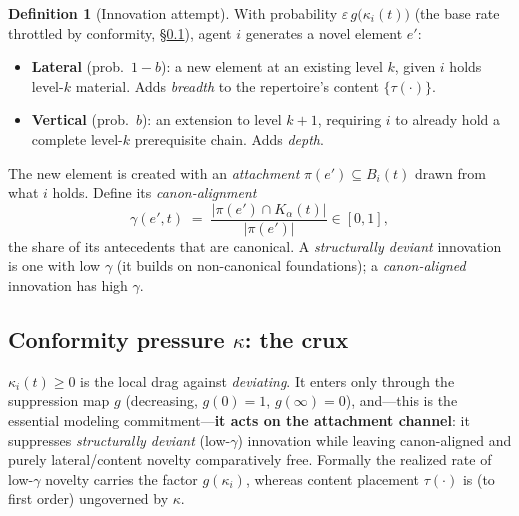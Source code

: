 \documentclass[11pt,letterpaper]{article}
\theoremstyle{definition}
\newtheorem{definition}{Definition}[section]
\theoremstyle{plain}
\newcommand{\pre}{\pi}
\newcommand{\card}[1]{\lvert #1 \rvert}
\begin{document}
\begin{definition}[Innovation attempt]\label{def:innovate}
With probability $\varepsilon\,g\!\big(\kappa_i(t)\big)$ (the base rate throttled
by conformity, \S\ref{sec:kappa}), agent $i$ generates a novel element $e'$:
\begin{itemize}[nosep]
  \item \textbf{Lateral} (prob.\ $1{-}b$): a new element at an existing level
  $k$, given $i$ holds level-$k$ material. Adds \emph{breadth} to the repertoire's
  content $\{\tau(\cdot)\}$.
  \item \textbf{Vertical} (prob.\ $b$): an extension to level $k{+}1$, requiring
  $i$ to already hold a complete level-$k$ prerequisite chain. Adds \emph{depth}.
\end{itemize}
The new element is created with an \emph{attachment} $\pre(e')\subseteq B_i(t)$
drawn from what $i$ holds. Define its \emph{canon-alignment}
\begin{equation}\label{eq:align}
  \gamma(e',t) \;=\; \frac{\card{\pre(e')\cap K_\alpha(t)}}{\card{\pre(e')}}\in[0,1],
\end{equation}
the share of its antecedents that are canonical. A \emph{structurally deviant}
innovation is one with low $\gamma$ (it builds on non-canonical foundations); a
\emph{canon-aligned} innovation has high $\gamma$.
\end{definition}

\subsection{Conformity pressure $\kappa$: the crux}\label{sec:kappa}

$\kappa_i(t)\ge 0$ is the local drag against \emph{deviating}. It enters only
through the suppression map $g$ (decreasing, $g(0)=1$, $g(\infty)=0$), and---this
is the essential modeling commitment---\textbf{it acts on the attachment channel}:
it suppresses \emph{structurally deviant} (low-$\gamma$) innovation while leaving
canon-aligned and purely lateral/content novelty comparatively free. Formally the
realized rate of low-$\gamma$ novelty carries the factor $g(\kappa_i)$, whereas
content placement $\tau(\cdot)$ is (to first order) ungoverned by $\kappa$.
\end{document}
